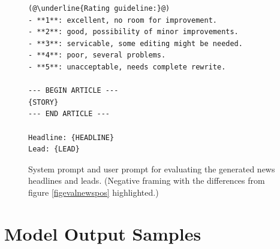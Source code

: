 \documentclass[UTF8,noindent,nohyp,parspace,titlepage,a4paper,12pt]{article}
\begin{document}
\begin{figure}[hbtp]
\begin{lstlisting}[basicstyle=\scriptsize\sffamily,frame=single,linewidth=\textwidth]
(@\underline{Rating guideline:}@)
- **1**: excellent, no room for improvement.
- **2**: good, possibility of minor improvements.
- **3**: servicable, some editing might be needed.
- **4**: poor, several problems.
- **5**: unacceptable, needs complete rewrite.

--- BEGIN ARTICLE ---
{STORY}
--- END ARTICLE ---

Headline: {HEADLINE}
Lead: {LEAD}
      \end{lstlisting}
      \caption{%
        System prompt and user prompt for evaluating the generated news
        headlines and leads. (Negative framing with the differences from
        figure \ref{figevalnewspos} highlighted.)
      }
      \label{figevalnewsneg}
    \end{figure}

\clearpage

  \section{Model Output Samples}
\end{document}
